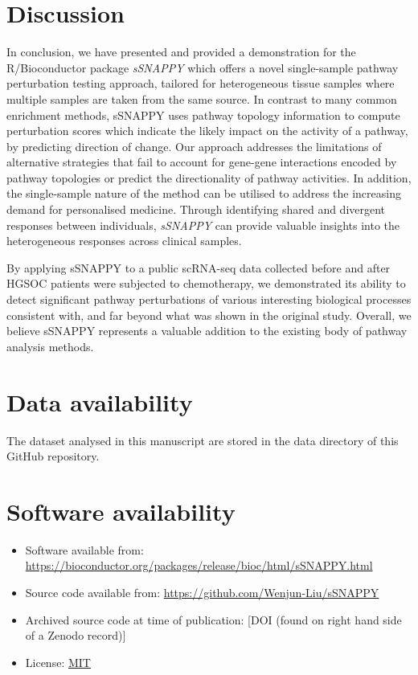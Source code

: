 \documentclass[9pt,a4paper,]{extarticle}
\begin{document}
\hypertarget{discussion}{%
\section{Discussion}\label{discussion}}

In conclusion, we have presented and provided a demonstration for the R/Bioconductor package \emph{sSNAPPY} which offers a novel single-sample pathway perturbation testing approach, tailored for heterogeneous tissue samples where multiple samples are taken from the same source.
In contrast to many common enrichment methods, sSNAPPY uses pathway topology information to compute perturbation scores which indicate the likely impact on the activity of a pathway, by predicting direction of change.
Our approach addresses the limitations of alternative strategies that fail to account for gene-gene interactions encoded by pathway topologies or predict the directionality of pathway activities.
In addition, the single-sample nature of the method can be utilised to address the increasing demand for personalised medicine.
Through identifying shared and divergent responses between individuals, \emph{sSNAPPY} can provide valuable insights into the heterogeneous responses across clinical samples.

By applying sSNAPPY to a public scRNA-seq data collected before and after HGSOC patients were subjected to chemotherapy, we demonstrated its ability to detect significant pathway perturbations of various interesting biological processes consistent with, and far beyond what was shown in the original study.
Overall, we believe sSNAPPY represents a valuable addition to the existing body of pathway analysis methods.

\hypertarget{data-availability}{%
\section{Data availability}\label{data-availability}}

The dataset analysed in this manuscript are stored in the data directory of this GitHub repository.

\hypertarget{software-availability}{%
\section{Software availability}\label{software-availability}}

\begin{itemize}
\item
  Software available from: \url{https://bioconductor.org/packages/release/bioc/html/sSNAPPY.html}
\item
  Source code available from: \url{https://github.com/Wenjun-Liu/sSNAPPY}
\item
  Archived source code at time of publication: {[}DOI (found on right hand side of a Zenodo record){]}
\item
  License: \href{https://opensource.org/license/mit/}{MIT}
\end{itemize}
\end{document}
